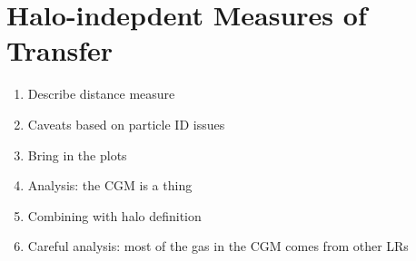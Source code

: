 \section{Halo-indepdent Measures of Transfer}

\begin{enumerate}
    \item Describe distance measure
    \item Caveats based on particle ID issues
    \item Bring in the plots
    \item Analysis: the CGM is a thing
    \item Combining with halo definition
    \item Careful analysis: most of the gas in the CGM comes from other LRs
\end{enumerate}